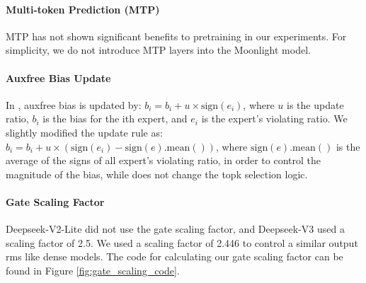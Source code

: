 \paragraph{Multi-token Prediction (MTP)} MTP has not shown significant benefits to pretraining in our experiments. For simplicity, we do not introduce MTP layers into the Moonlight model.

\paragraph{Auxfree Bias Update} In \cite{deepseekai2024deepseekv3technicalreport}, auxfree bias is updated by: $b_i = b_i + u \times  \text{sign}(e_i)$, where $u$ is the update ratio, $b_i$ is the bias for the ith expert, and $e_i$ is the expert's violating ratio. We slightly modified the update rule as: $b_i = b_i + u \times (\text{sign}(e_i) - \text{sign}(e).\text{mean}())$, where $\text{sign}(e).\text{mean}()$ is the average of the signs of all expert's violating ratio, in order to control the magnitude of the bias, while does not change the topk selection logic.

\paragraph{Gate Scaling Factor} Deepseek-V2-Lite did not use the gate scaling factor, and Deepseek-V3 used a scaling factor of 2.5. We used a scaling factor of 2.446 to control a similar output rms like dense models. The code for calculating our gate scaling factor can be found in Figure \ref{fig:gate_scaling_code}.




